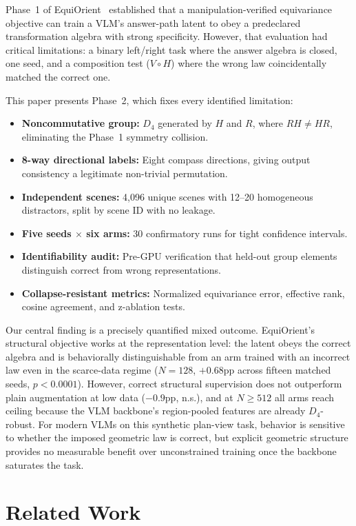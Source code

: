 \documentclass[10pt,twocolumn,letterpaper]{article}
\begin{document}
Phase~1 of EquiOrient~\cite{equiorient_phase1} established that a
manipulation-verified equivariance objective can train a VLM's
answer-path latent to obey a predeclared transformation algebra with
strong specificity. However, that evaluation had critical limitations:
a binary left/right task where the answer algebra is closed, one seed,
and a composition test ($V \circ H$) where the wrong law coincidentally
matched the correct one.

This paper presents Phase~2, which fixes every identified limitation:
\begin{itemize}[leftmargin=*]
\item \textbf{Noncommutative group:} $D_4$ generated by $H$ and $R$,
where $RH \neq HR$, eliminating the Phase~1 symmetry collision.
\item \textbf{8-way directional labels:} Eight compass directions,
giving output consistency a legitimate non-trivial permutation.
\item \textbf{Independent scenes:} 4,096 unique scenes with 12--20
homogeneous distractors, split by scene ID with no leakage.
\item \textbf{Five seeds $\times$ six arms:} 30 confirmatory runs for
tight confidence intervals.
\item \textbf{Identifiability audit:} Pre-GPU verification that
held-out group elements distinguish correct from wrong representations.
\item \textbf{Collapse-resistant metrics:} Normalized equivariance
error, effective rank, cosine agreement, and z-ablation tests.
\end{itemize}

Our central finding is a precisely quantified mixed outcome.
EquiOrient's structural objective works at the representation level:
the latent obeys the correct algebra and is behaviorally
distinguishable from an arm trained with an incorrect law even in the
scarce-data regime ($N{=}128$, $+0.68$pp across fifteen matched seeds,
$p<0.0001$). However, correct structural supervision does not
outperform plain augmentation at low data ($-0.9$pp, n.s.), and at
$N \geq 512$ all arms reach ceiling because the VLM backbone's
region-pooled features are already $D_4$-robust. For modern VLMs on
this synthetic plan-view task, behavior is sensitive to whether the
imposed geometric law is correct, but explicit geometric structure
provides no measurable benefit over unconstrained training once the
backbone saturates the task.

\section{Related Work}
\label{sec:related}
\end{document}
